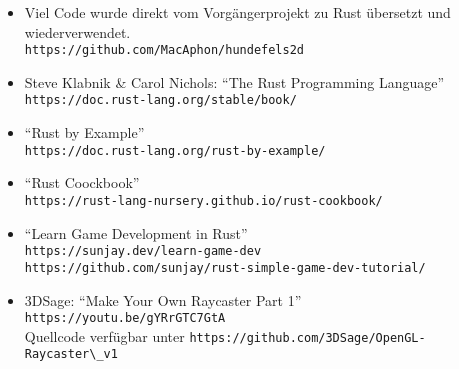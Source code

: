 \documentclass[a4paper,titlepage]{article}
\begin{document}
    \begin{itemize}
        \item Viel Code wurde direkt vom Vorgängerprojekt zu Rust übersetzt und wiederverwendet. \\
        \verb|https://github.com/MacAphon/hundefels2d|
        
        \item Steve Klabnik \& Carol Nichols: ``The Rust Programming Language'' \\
        \verb|https://doc.rust-lang.org/stable/book/|
        
        \item ``Rust by Example'' \\
        \verb|https://doc.rust-lang.org/rust-by-example/|
        
        \item ``Rust Coockbook'' \\
        \verb|https://rust-lang-nursery.github.io/rust-cookbook/|
        
        \item ``Learn Game Development in Rust'' \\
        \verb|https://sunjay.dev/learn-game-dev| \\
        \verb|https://github.com/sunjay/rust-simple-game-dev-tutorial/|
        
        \item 3DSage: ``Make Your Own Raycaster Part 1'' \\ \verb|https://youtu.be/gYRrGTC7GtA|\\ 
        Quellcode verfügbar unter \verb|https://github.com/3DSage/OpenGL-Raycaster\_v1|
    \end{itemize}
    
\end{document}
